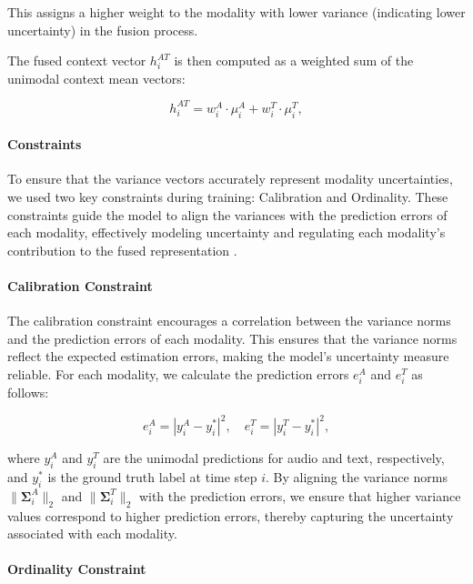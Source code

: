 \documentclass[9pt,a4paper]{rho-class/rho}
\begin{document}
This assigns a higher weight to the modality with lower variance (indicating lower uncertainty) in the fusion process.

The fused context vector $h_i^{AT}$ is then computed as a weighted sum of the unimodal context mean vectors:

\begin{equation*} 
h_i^{AT} = w_i^A \cdot \mu_i^A + w_i^T \cdot \mu_i^T, 
\end{equation*}

\paragraph{Constraints}

To ensure that the variance vectors accurately represent modality uncertainties, we used two key constraints during training: Calibration and Ordinality. These constraints guide the model to align the variances with the prediction errors of each modality, effectively modeling uncertainty and regulating each modality's contribution to the fused representation \cite{tellamekala2023cold}.

\paragraph{Calibration Constraint}

The calibration constraint encourages a correlation between the variance norms and the prediction errors of each modality. This ensures that the variance norms reflect the expected estimation errors, making the model’s uncertainty measure reliable. For each modality, we calculate the prediction errors \( e_i^A \) and \( e_i^T \) as follows:

\begin{equation}
    e_i^A = | y_i^A - y_i^\ast |^2, \quad e_i^T = | y_i^T - y_i^\ast |^2,
\end{equation}

where \( y_i^A \) and \( y_i^T \) are the unimodal predictions for audio and text, respectively, and \( y_i^\ast \) is the ground truth label at time step \( i \). By aligning the variance norms \( \| \boldsymbol{\Sigma}_i^A \|_2 \) and \( \| \boldsymbol{\Sigma}_i^T \|_2 \) with the prediction errors, we ensure that higher variance values correspond to higher prediction errors, thereby capturing the uncertainty associated with each modality.

\paragraph{Ordinality Constraint}
\end{document}
